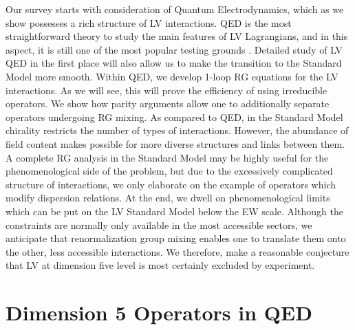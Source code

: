 \documentclass[12pt,preprintnumbers,nofootinbib]{revtex4}
\begin{document}
	Our survey starts with consideration of Quantum Electrodynamics, 
	which as we show possesses a rich structure of LV interactions.
	QED is the most straightforward theory
	to study the main features of LV Lagrangians, and 
	in this aspect,
	it is still one of the most popular testing grounds 
\cite{CFJ,CG,Ted1,MP:,Bolokhov:2005cj}.
	Detailed study of LV QED in the first place will also 
	allow us to make the transition to the Standard Model more
	smooth. 
	Within QED, we develop 1-loop RG equations for the LV interactions.
	As we will see, this will prove the efficiency of using irreducible
	operators.
	We show how parity arguments allow one to additionally 
	separate operators undergoing RG mixing.
	As compared to QED, in the Standard Model chirality restricts the number of types
	of interactions. 
	However, the abundance of field content makes possible for more diverse 
	structures and links between them.
	A complete RG analysis in the Standard Model may be highly useful for 
	the phenomenological side of the problem, but due to the excessively 
	complicated structure of interactions, we only elaborate on the example of 
	operators which modify dispersion relations.
	At the end, we dwell on phenomenological limits which can be put
	on the LV Standard Model below the EW scale.
	Although the constraints are normally only available in the most
	accessible sectors, we anticipate that renormalization group mixing
	enables one to translate them onto the other, less accessible interactions.
	We therefore, make a reasonable conjecture that LV at dimension five level is
	most certainly excluded by experiment.
	
	

\section{Dimension 5 Operators in QED}
\end{document}
